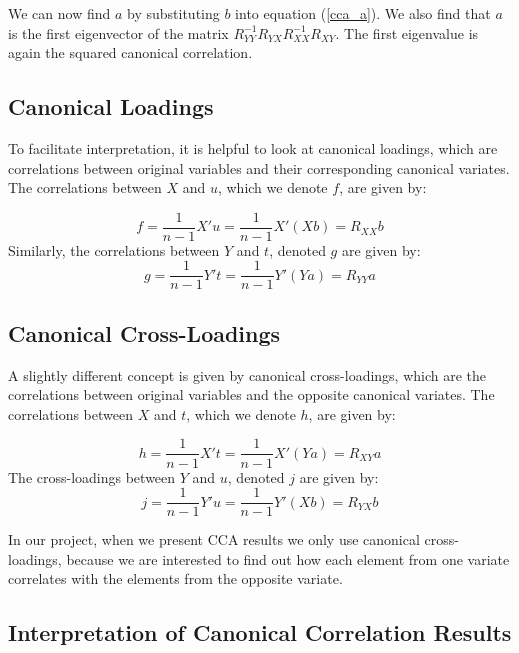 We can now find $a$ by substituting $b$ into equation (\ref{cca_a}). We also find that $a$ is the first eigenvector of the matrix $R^{-1}_{YY}R_{YX}R^{-1}_{XX}R_{XY}$. The first eigenvalue is again the squared canonical correlation.

\subsection{Canonical Loadings}

To facilitate interpretation, it is helpful to look at canonical loadings, which are correlations between original variables and their corresponding canonical variates. The correlations between $X$ and $u$, which we denote $f$, are given by:

\begin{equation}
 f = \frac{1}{n-1}X'u = \frac{1}{n-1}X'(Xb) = R_{XX}b
\end{equation}
Similarly, the correlations between $Y$ and $t$, denoted $g$ are given by:
\begin{equation}
 g = \frac{1}{n-1}Y't = \frac{1}{n-1}Y'(Ya) = R_{YY}a
\end{equation}

\subsection{Canonical Cross-Loadings}

A slightly different concept is given by canonical cross-loadings, which are the correlations between original variables and the opposite canonical variates. The correlations between $X$ and $t$, which we denote $h$, are given by:

\begin{equation}
 h = \frac{1}{n-1}X't = \frac{1}{n-1}X'(Ya) = R_{XY}a
\end{equation}
The cross-loadings between $Y$ and $u$, denoted $j$ are given by:
\begin{equation}
 j = \frac{1}{n-1}Y'u = \frac{1}{n-1}Y'(Xb) = R_{YX}b
\end{equation}

In our project, when we present CCA results we only use canonical cross-loadings, because we are interested to find out how each element from one variate correlates with the elements from the opposite variate.

\subsection{Interpretation of Canonical Correlation Results}


